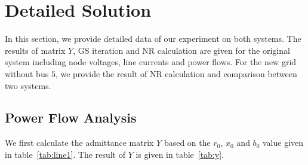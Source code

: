 \documentclass[conference]{IEEEtran}
\begin{document}
\section{Detailed Solution}
In this section, we provide detailed data of our experiment on both systems. The results of matrix $Y$, GS iteration and NR calculation are given for the original system including node voltages, line currents and power flows. For the new grid without bus $5$, we provide the result of NR calculation and comparison between two systems.

\begin{table}[]
	\begin{center}
	\end{center}
	\caption{The admittance matrix $Y$ for the original system.}
	\vspace{-5.5mm}
	\label{tab:y}
\end{table}

\subsection{Power Flow Analysis}\label{AA}
We first calculate the admittance matrix $Y$ based on the $r_0$, $x_0$ and $b_0$ value given in table~\ref{tab:line1}. The result of $Y$ is given in table~\ref{tab:y}.
\end{document}
